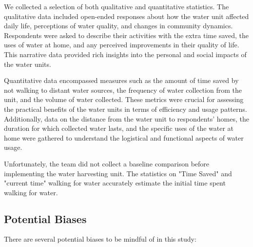 \documentclass[10pt, twocolumn]{article}
\begin{document}
We collected a selection of both qualitative and quantitative statistics. The qualitative data included open-ended responses about how the water unit affected daily life, perceptions of water quality, and changes in community dynamics. Respondents were asked to describe their activities with the extra time saved, the uses of water at home, and any perceived improvements in their quality of life. This narrative data provided rich insights into the personal and social impacts of the water units.

Quantitative data encompassed measures such as the amount of time saved by not walking to distant water sources, the frequency of water collection from the unit, and the volume of water collected. These metrics were crucial for assessing the practical benefits of the water units in terms of efficiency and usage patterns. Additionally, data on the distance from the water unit to respondents' homes, the duration for which collected water lasts, and the specific uses of the water at home were gathered to understand the logistical and functional aspects of water usage.

Unfortunately, the team did not collect a baseline comparison before implementing the water harvesting unit. The statistics on "Time Saved" and "current time" walking for water accurately estimate the initial time spent walking for water.

\subsection{Potential Biases}

There are several potential biases to be mindful of in this study:
\end{document}
